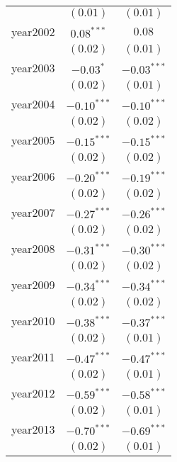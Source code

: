 \begin{center}
\begin{longtable}{l c c}
                      & $(0.01)$       & $(0.01)$               \\
year2002              & $0.08^{***}$   & $0.08$                 \\
                      & $(0.02)$       & $(0.01)$               \\
year2003              & $-0.03^{*}$    & $\mathbf{-0.03}^{***}$ \\
                      & $(0.02)$       & $(0.01)$               \\
year2004              & $-0.10^{***}$  & $\mathbf{-0.10}^{***}$ \\
                      & $(0.02)$       & $(0.02)$               \\
year2005              & $-0.15^{***}$  & $\mathbf{-0.15}^{***}$ \\
                      & $(0.02)$       & $(0.02)$               \\
year2006              & $-0.20^{***}$  & $\mathbf{-0.19}^{***}$ \\
                      & $(0.02)$       & $(0.02)$               \\
year2007              & $-0.27^{***}$  & $\mathbf{-0.26}^{***}$ \\
                      & $(0.02)$       & $(0.02)$               \\
year2008              & $-0.31^{***}$  & $\mathbf{-0.30}^{***}$ \\
                      & $(0.02)$       & $(0.02)$               \\
year2009              & $-0.34^{***}$  & $\mathbf{-0.34}^{***}$ \\
                      & $(0.02)$       & $(0.02)$               \\
year2010              & $-0.38^{***}$  & $\mathbf{-0.37}^{***}$ \\
                      & $(0.02)$       & $(0.01)$               \\
year2011              & $-0.47^{***}$  & $\mathbf{-0.47}^{***}$ \\
                      & $(0.02)$       & $(0.01)$               \\
year2012              & $-0.59^{***}$  & $\mathbf{-0.58}^{***}$ \\
                      & $(0.02)$       & $(0.01)$               \\
year2013              & $-0.70^{***}$  & $\mathbf{-0.69}^{***}$ \\
                      & $(0.02)$       & $(0.01)$               \\

\end{longtable}
\end{center}
